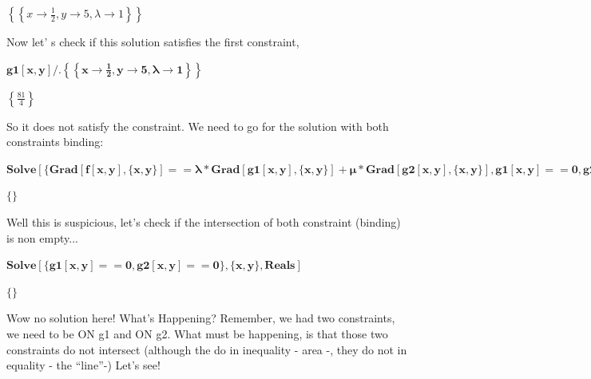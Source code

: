 \begin{doublespace}
\noindent\(\left\{\left\{x\to \frac{1}{2},y\to 5,\lambda \to 1\right\}\right\}\)
\end{doublespace}

Now let' s check if this solution satisfies the first constraint,

\begin{doublespace}
\noindent\(\pmb{\text{g1}[x,y]\text{/.}\left\{\left\{x\to \frac{1}{2},y\to 5,\lambda \to 1\right\}\right\}}\)
\end{doublespace}

\begin{doublespace}
\noindent\(\left\{\frac{81}{4}\right\}\)
\end{doublespace}

So it does not satisfy the constraint. We need to go for the solution with both constraints binding:
\footnotesize
\begin{doublespace}
\noindent\(\pmb{\text{Solve}[\{\text{Grad}[f[x,y],\{x,y\}]==\lambda *\text{Grad}[\text{g1}[x,y],\{x,y\}]+\mu *\text{Grad}[\text{g2}[x,y],\{x,y\}],\text{g1}[x,y]==0,\text{g2}[x,y]==0\},\{x,y,\lambda
,\mu \},\text{Reals}]}\)
\end{doublespace}
\normalsize

\begin{doublespace}
\noindent\(\{\}\)
\end{doublespace}

Well this is suspicious, let's check if the intersection of both constraint (binding) is non empty...

\begin{doublespace}
\noindent\(\pmb{\text{Solve}[\{\text{g1}[x,y]==0,\text{g2}[x,y]==0\},\{x,y\},\text{Reals}]}\)
\end{doublespace}

\begin{doublespace}
\noindent\(\{\}\)
\end{doublespace}

Wow no solution here! What{'}s Happening? Remember, we had two constraints, we need to be ON g1 and ON g2. What must be happening, is that those
two constraints do not intersect (although the do in inequality - area -, they do not in equality - the {``}line{''}-) Let{'}s see!

